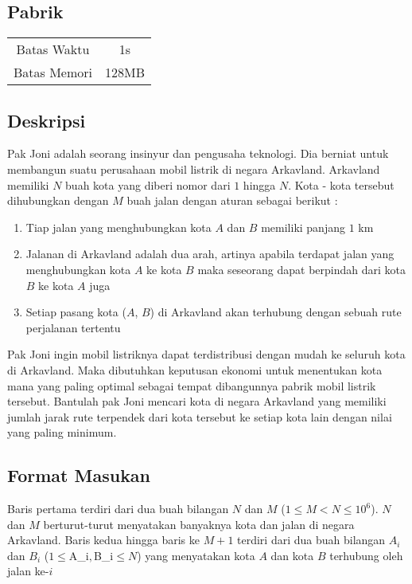 \documentclass{article}
\begin{document}
\begin{center}
    \section*{Pabrik} %

    \begin{tabular}{ | c c | }
        \hline
        Batas Waktu  & 1s \\    %
        Batas Memori & 128MB \\  %
        \hline
    \end{tabular}
\end{center}

\subsection*{Deskripsi}

Pak Joni adalah seorang insinyur dan pengusaha teknologi. Dia berniat untuk membangun suatu perusahaan mobil listrik di negara Arkavland.
Arkavland memiliki $N$ buah kota yang diberi nomor dari $1$ hingga $N$. Kota - kota tersebut dihubungkan dengan $M$ buah jalan dengan aturan sebagai berikut :

\begin{enumerate}
    \setlength\itemsep{0pt}
    \item Tiap jalan yang menghubungkan kota $A$ dan $B$ memiliki panjang $1$ km
    \item Jalanan di Arkavland adalah dua arah, artinya apabila terdapat jalan yang menghubungkan kota $A$ ke kota $B$ maka seseorang dapat berpindah dari kota $B$ ke kota $A$ juga
    \item Setiap pasang kota ($A$, $B$) di Arkavland akan terhubung dengan sebuah rute perjalanan tertentu
    
\end{enumerate}

Pak Joni ingin mobil listriknya dapat terdistribusi dengan mudah ke seluruh kota di Arkavland. Maka dibutuhkan keputusan ekonomi untuk menentukan kota mana yang paling optimal sebagai tempat dibangunnya pabrik mobil listrik tersebut. Bantulah pak Joni mencari kota di negara Arkavland yang memiliki jumlah jarak rute terpendek dari kota tersebut ke setiap kota lain dengan nilai yang paling minimum.

\subsection*{Format Masukan}
Baris pertama terdiri dari dua buah bilangan $N$ dan $M$ ($1 \leq M < N \leq 10^{6}$). $N$ dan $M$ berturut-turut menyatakan banyaknya kota dan jalan di negara Arkavland.
Baris kedua hingga baris ke $M + 1$ terdiri dari dua buah bilangan $A_i$ dan $B_i$ ($1 \leq $A_i$,$B_i$ \leq N$) yang menyatakan kota $A$ dan kota $B$ terhubung oleh jalan ke-$i$
\end{document}
